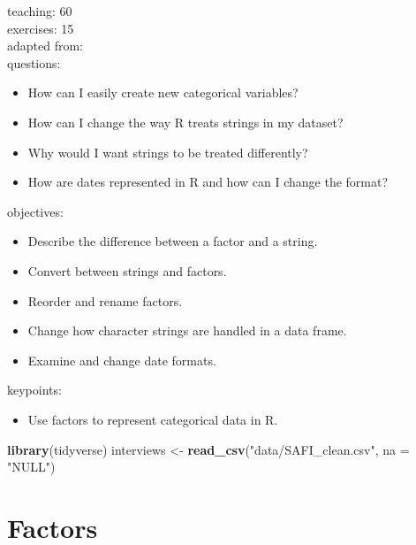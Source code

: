 \documentclass[]{book}
\newenvironment{Shaded}{\begin{snugshade}}{\end{snugshade}}
\newcommand{\KeywordTok}[1]{\textcolor[rgb]{0.13,0.29,0.53}{\textbf{#1}}}
\newcommand{\DataTypeTok}[1]{\textcolor[rgb]{0.13,0.29,0.53}{#1}}
\newcommand{\StringTok}[1]{\textcolor[rgb]{0.31,0.60,0.02}{#1}}
\newcommand{\NormalTok}[1]{#1}
\providecommand{\tightlist}{%
  \setlength{\itemsep}{0pt}\setlength{\parskip}{0pt}}
\begin{document}
teaching: 60\\
exercises: 15\\
adapted from:\\
questions:

\begin{itemize}
\tightlist
\item
  How can I easily create new categorical variables?
\item
  How can I change the way R treats strings in my dataset?\\
\item
  Why would I want strings to be treated differently?\\
\item
  How are dates represented in R and how can I change the format?
\end{itemize}

objectives:

\begin{itemize}
\tightlist
\item
  Describe the difference between a factor and a string.\\
\item
  Convert between strings and factors.\\
\item
  Reorder and rename factors.\\
\item
  Change how character strings are handled in a data frame.\\
\item
  Examine and change date formats.
\end{itemize}

keypoints:

\begin{itemize}
\tightlist
\item
  Use factors to represent categorical data in R.
\end{itemize}

\begin{Shaded}
\begin{Highlighting}[]
\KeywordTok{library}\NormalTok{(tidyverse)}
\NormalTok{interviews <-}\StringTok{ }\KeywordTok{read_csv}\NormalTok{(}\StringTok{"data/SAFI_clean.csv"}\NormalTok{, }\DataTypeTok{na =} \StringTok{"NULL"}\NormalTok{)}
\end{Highlighting}
\end{Shaded}

\section{Factors}\label{factors}
\end{document}
